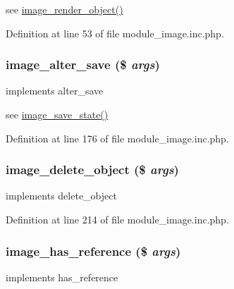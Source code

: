 see \hyperlink{module__image_8inc_8php_a4fadded2a225d1b5ea73404a84597620}{image\_\-render\_\-object()} 

Definition at line 53 of file module\_\-image.inc.php.

\hypertarget{module__image_8inc_8php_a93578776fb38b10d47bc711cc3469ae9}{
\subsubsection[{image\_\-alter\_\-save}]{\setlength{\rightskip}{0pt plus 5cm}image\_\-alter\_\-save (\$ {\em args})}}
\label{module__image_8inc_8php_a93578776fb38b10d47bc711cc3469ae9}
implements alter\_\-save

see \hyperlink{module__image_8inc_8php_ac26ea1448f0b7ed835907cf7c22b60ca}{image\_\-save\_\-state()} 

Definition at line 176 of file module\_\-image.inc.php.

\hypertarget{module__image_8inc_8php_a7cbcf6138ccff16a8b733cfd6f0f1666}{
\subsubsection[{image\_\-delete\_\-object}]{\setlength{\rightskip}{0pt plus 5cm}image\_\-delete\_\-object (\$ {\em args})}}
\label{module__image_8inc_8php_a7cbcf6138ccff16a8b733cfd6f0f1666}
implements delete\_\-object 

Definition at line 214 of file module\_\-image.inc.php.

\hypertarget{module__image_8inc_8php_a0bef6164f5eafe368d251639cf6fe298}{
\subsubsection[{image\_\-has\_\-reference}]{\setlength{\rightskip}{0pt plus 5cm}image\_\-has\_\-reference (\$ {\em args})}}
\label{module__image_8inc_8php_a0bef6164f5eafe368d251639cf6fe298}
implements has\_\-reference 

